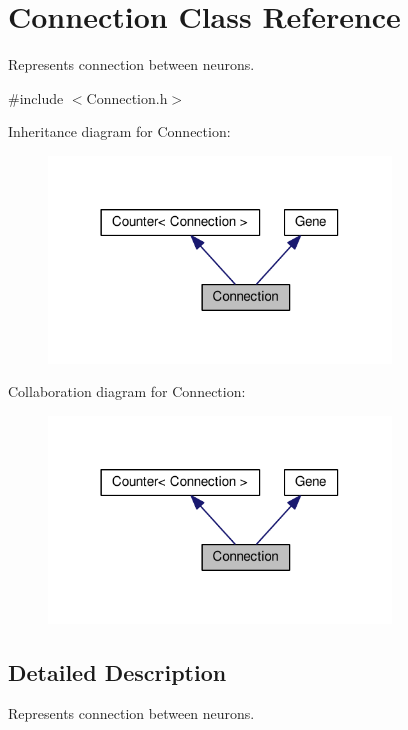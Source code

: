 \hypertarget{classConnection}{}\section{Connection Class Reference}
\label{classConnection}


Represents connection between neurons.  




{\ttfamily \#include $<$Connection.\+h$>$}



Inheritance diagram for Connection\+:\nopagebreak
\begin{figure}[H]
\begin{center}
\leavevmode
\includegraphics[width=258pt]{classConnection__inherit__graph}
\end{center}
\end{figure}


Collaboration diagram for Connection\+:\nopagebreak
\begin{figure}[H]
\begin{center}
\leavevmode
\includegraphics[width=258pt]{classConnection__coll__graph}
\end{center}
\end{figure}


\subsection{Detailed Description}
Represents connection between neurons. 

